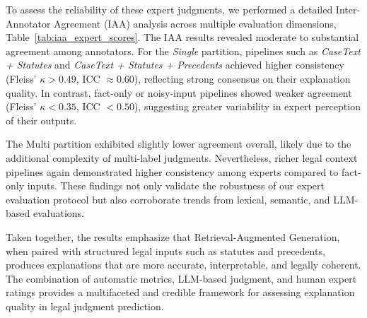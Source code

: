 To assess the reliability of these expert judgments, we performed a detailed Inter-Annotator Agreement (IAA) analysis across multiple evaluation dimensions, Table~\ref{tab:iaa_expert_scores}. The IAA results revealed moderate to substantial agreement among annotators. For the \textit{Single} partition, pipelines such as \textit{CaseText + Statutes} and \textit{CaseText + Statutes + Precedents} achieved higher consistency (Fleiss’ $\kappa > 0.49$, ICC $\approx 0.60$), reflecting strong consensus on their explanation quality. In contrast, fact-only or noisy-input pipelines showed weaker agreement (Fleiss’ $\kappa < 0.35$, ICC $< 0.50$), suggesting greater variability in expert perception of their outputs.

The {Multi} partition exhibited slightly lower agreement overall, likely due to the additional complexity of multi-label judgments. Nevertheless, richer legal context pipelines again demonstrated higher consistency among experts compared to fact-only inputs. These findings not only validate the robustness of our expert evaluation protocol but also corroborate trends from lexical, semantic, and LLM-based evaluations.

Taken together, the results emphasize that Retrieval-Augmented Generation, when paired with structured legal inputs such as statutes and precedents, produces explanations that are more accurate, interpretable, and legally coherent. The combination of automatic metrics, LLM-based judgment, and human expert ratings provides a multifaceted and credible framework for assessing explanation quality in legal judgment prediction.
